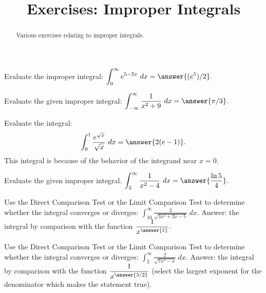 \documentclass{ximera}
\title{Exercises: Improper Integrals}
\begin{document}
\begin{abstract}
Various exercises relating to improper integrals.
\end{abstract}
\maketitle

\begin{exercise}%
Evaluate the improper integral: \(\displaystyle \int_0^\infty e^{5-2x}\ dx = \answer{(e^5)/2}.\)
%
%
\end{exercise}

\begin{exercise}%
Evaluate the given improper integral: \(\displaystyle \int_{-\infty}^\infty \frac{1}{x^2+9}\ dx = \answer{\pi/3}.\)
%
%
\end{exercise}

\begin{exercise}
Evaluate the integral: \[ \int_0^1 \frac{e^{\sqrt{x}}}{\sqrt{x}} \ dx = \answer{2(e-1)}. \]
This integral is  because of the behavior of the integrand near $x = 0$.
\end{exercise}

\begin{exercise}%
Evaluate the given improper integral. \(\displaystyle \int_{3}^\infty\frac{1}{x^2-4}\ dx = \answer{\frac{\ln 5}{4}}.\)
%
%
\end{exercise}

\begin{exercise}%
Use the Direct Comparison Test or the Limit Comparison Test to determine whether the integral converges or diverges:
 \(\displaystyle \int_{10}^\infty \frac{3}{\sqrt{3x^2+2x-5}} \ dx.\)
 Answer: the integral 
  by  comparison with the function $\displaystyle \frac{1}{x^{\answer{1}}}.$
%
%
\end{exercise}

\begin{exercise}
Use the Direct Comparison Test or the Limit Comparison Test to determine whether the integral converges or diverges:
 \(\displaystyle \int_{2}^\infty \frac{2}{\sqrt{7x^3-x}} \ dx.\)
 Answer: the integral 
  by  comparison with the function $\displaystyle \frac{1}{x^{\answer{3/2}}}$ (select the largest exponent for the denominator which makes the statement true).
\end{exercise}
\end{document}
